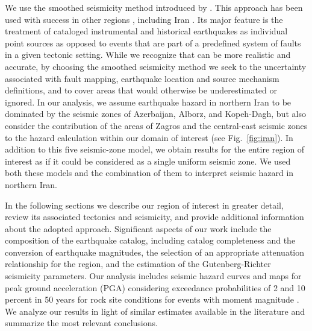  We use the smoothed seismicity method introduced by \citet{Frankel1995}. This approach has been used with success in other regions \citep[e.g.][]{Cao1996, Akinci2004, Kalkan2009}, including Iran \citep{Khodaverdian_2016_BSSA}.  Its major feature is the treatment of cataloged instrumental and historical earthquakes as individual point sources as opposed to events that are part of a predefined system of faults in a given tectonic setting. While we recognize that  can be more realistic and accurate, by choosing the smoothed seismicity method we seek to  the uncertainty associated with fault mapping, earthquake location and source mechanism definitions, and to cover areas that would otherwise be underestimated or ignored. In our analysis, we assume earthquake hazard in northern Iran to be dominated by the seismic zones of Azerbaijan, Alborz, and Kopeh-Dagh, but also consider the contribution of the areas of Zagros and the central-east seismic zones to the hazard calculation within our domain of interest (see Fig.~\ref{fig:iran}). In addition to this five seismic-zone model, we obtain results for the entire region of interest as if it could be considered as a single uniform seismic zone. We used both these models and the combination of them to interpret seismic hazard in northern Iran.

In the following sections we describe our region of interest in greater detail, review its associated tectonics and seismicity, and provide additional information about the adopted approach. Significant aspects of our work include the composition of the earthquake catalog, including catalog completeness and the conversion of earthquake magnitudes, the selection of an appropriate attenuation relationship for the region, and the estimation of the Gutenberg-Richter seismicity parameters. Our analysis includes seismic hazard curves and maps for peak ground acceleration (PGA) considering exceedance probabilities of 2 and 10 percent in 50 years for rock site conditions for events with moment magnitude . We analyze our results in light of similar estimates available in the literature and summarize the most relevant conclusions.

